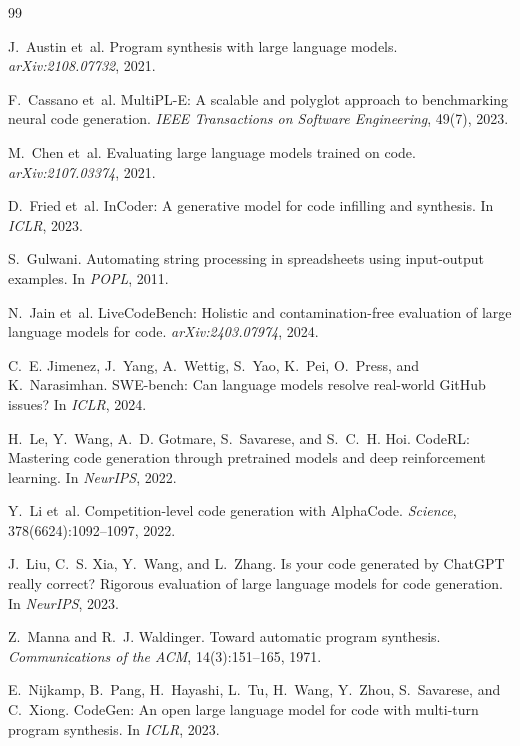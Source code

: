 \documentclass[11pt,a4paper]{article}
\begin{document}
\begin{thebibliography}{99}

J.~Austin et~al.
\newblock Program synthesis with large language models.
\newblock \emph{arXiv:2108.07732}, 2021.

F.~Cassano et~al.
\newblock MultiPL-E: A scalable and polyglot approach to benchmarking neural
  code generation.
\newblock \emph{IEEE Transactions on Software Engineering}, 49(7), 2023.

M.~Chen et~al.
\newblock Evaluating large language models trained on code.
\newblock \emph{arXiv:2107.03374}, 2021.

D.~Fried et~al.
\newblock InCoder: A generative model for code infilling and synthesis.
\newblock In \emph{ICLR}, 2023.

S.~Gulwani.
\newblock Automating string processing in spreadsheets using input-output
  examples.
\newblock In \emph{POPL}, 2011.

N.~Jain et~al.
\newblock LiveCodeBench: Holistic and contamination-free evaluation of large
  language models for code.
\newblock \emph{arXiv:2403.07974}, 2024.

C.~E. Jimenez, J.~Yang, A.~Wettig, S.~Yao, K.~Pei, O.~Press, and K.~Narasimhan.
\newblock SWE-bench: Can language models resolve real-world GitHub issues?
\newblock In \emph{ICLR}, 2024.

H.~Le, Y.~Wang, A.~D. Gotmare, S.~Savarese, and S.~C.~H. Hoi.
\newblock CodeRL: Mastering code generation through pretrained models and deep
  reinforcement learning.
\newblock In \emph{NeurIPS}, 2022.

Y.~Li et~al.
\newblock Competition-level code generation with AlphaCode.
\newblock \emph{Science}, 378(6624):1092--1097, 2022.

J.~Liu, C.~S. Xia, Y.~Wang, and L.~Zhang.
\newblock Is your code generated by ChatGPT really correct? Rigorous evaluation
  of large language models for code generation.
\newblock In \emph{NeurIPS}, 2023.

Z.~Manna and R.~J. Waldinger.
\newblock Toward automatic program synthesis.
\newblock \emph{Communications of the ACM}, 14(3):151--165, 1971.

E.~Nijkamp, B.~Pang, H.~Hayashi, L.~Tu, H.~Wang, Y.~Zhou, S.~Savarese, and
  C.~Xiong.
\newblock CodeGen: An open large language model for code with multi-turn
  program synthesis.
\newblock In \emph{ICLR}, 2023.


\end{thebibliography}
\end{document}
